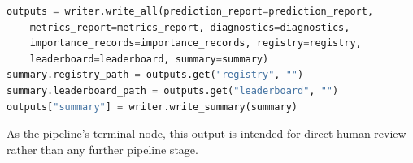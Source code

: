 \begin{lstlisting}[language=Python, caption={The summary is populated with artifact paths only after \texttt{write\_all} has produced them, then written last.}, label={lst:evaluation-summary-order}]
outputs = writer.write_all(prediction_report=prediction_report,
    metrics_report=metrics_report, diagnostics=diagnostics,
    importance_records=importance_records, registry=registry,
    leaderboard=leaderboard, summary=summary)
summary.registry_path = outputs.get("registry", "")
summary.leaderboard_path = outputs.get("leaderboard", "")
outputs["summary"] = writer.write_summary(summary)
\end{lstlisting} As the pipeline's terminal node, this output is intended for direct human review rather than any further pipeline stage.

